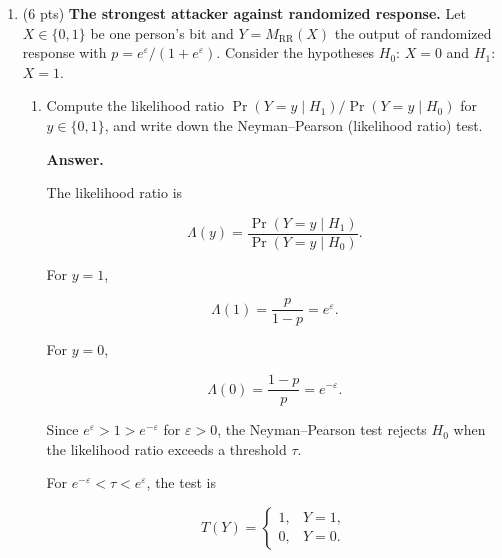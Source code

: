 \documentclass[11pt]{article}
\newcommand{\cA}{\mathcal{A}}
\newcommand{\eps}{\varepsilon}
\newenvironment{answer}{\par\medskip\noindent\textbf{Answer.}\ }{\par\bigskip}
\begin{document}
\begin{enumerate}
\begin{answer}
Taking $S=(-\infty,t]$ and integrating,

\[
\Pr(\cA(D)\in S)
>e^\eps\Pr(\cA(D')\in S).
\]

This violates the definition of
$(\eps,0)$-DP. Therefore, the Gaussian
mechanism is not pure DP for any finite
$\eps$.

In contrast, the Laplace distribution
has a bounded density ratio due to the
triangle inequality:

\[
\frac{p_D(y)}{p_{D'}(y)}
\le \exp\left(
\frac{|f(D)-f(D')|}{b}
\right).
\]

Hence, Laplace noise can provide pure DP.

For Gaussian noise, the density ratio
remains unbounded regardless of how large
the finite variance is. Increasing $\sigma$
only makes the violating tail events less
likely, but never eliminates them.
Therefore, the Gaussian mechanism requires
$\delta>0$ for any finite $\eps$.

\end{answer}

\item (6 pts) \textbf{The strongest attacker against randomized response.}
Let $X\in\{0,1\}$ be one person's bit and $Y=M_{\mathrm{RR}}(X)$ the output of
randomized response with $p=e^{\eps}/(1+e^{\eps})$. Consider the hypotheses
$H_0$: $X=0$ and $H_1$: $X=1$.
\begin{enumerate}

\item Compute the likelihood ratio
$\Pr(Y=y\mid H_1)/\Pr(Y=y\mid H_0)$ for $y\in\{0,1\}$, and write down the
Neyman--Pearson (likelihood ratio) test.

\begin{answer}

The likelihood ratio is

\[
\Lambda(y)=
\frac{\Pr(Y=y\mid H_1)}
{\Pr(Y=y\mid H_0)}.
\]

For $y=1$,

\[
\Lambda(1)=\frac{p}{1-p}=e^\eps.
\]

For $y=0$,

\[
\Lambda(0)=\frac{1-p}{p}=e^{-\eps}.
\]

Since $e^\eps>1>e^{-\eps}$ for $\eps>0$,
the Neyman--Pearson test rejects $H_0$
when the likelihood ratio exceeds a
threshold $\tau$.

For $e^{-\eps}<\tau<e^\eps$, the test is

\[
T(Y)=
\begin{cases}
1, & Y=1,\\
0, & Y=0.
\end{cases}
\]


\end{answer}
\end{enumerate}
\end{enumerate}
\end{document}
